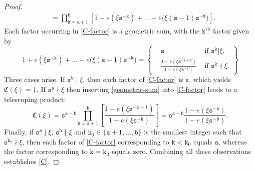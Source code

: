 \documentclass[12pt, twoside]{article}
\theoremstyle{definition}
\numberwithin{equation}{section}
\begin{document}
\begin{proof}
\begin{align}
&= \prod_{\mathtt k=\mathtt a+1}^{\mathtt b} \left[ 1 + e(\xi \mathtt s^{-\mathtt k}) + \ldots + e \bigl(\xi(\mathtt s-1) \mathtt s^{- \mathtt k} \bigr) \right].  \label{C-factor} 
\end{align} 
Each factor occurring in \eqref{C-factor} is a geometric sum, with the $\mathtt k^{\text{th}}$ factor given by 
\begin{equation}   1 + e(\xi \mathtt s^{-\mathtt k}) + \ldots + e \bigl(\xi(\mathtt s-1) \mathtt s^{- \mathtt k} \bigr) = \left\{ \begin{aligned} &\mathtt s &\text{ if } \mathtt s^{\mathtt k} | \xi, \\ &\frac{1 - e(\xi \mathtt s^{-\mathtt k + 1})}{1 - e(\xi \mathtt s^{-\mathtt k})} &\text{ if } \mathtt s^{\mathtt k} \nmid \xi.  \end{aligned} \right\} \label{geometric-sum}  \end{equation} 
Three cases arise. If $\mathtt s^{\mathtt b} \mid \xi$, then each factor of \eqref{C-factor} is $\mathtt s$, which yields $\mathfrak C(\xi) = 1$. If $\mathtt s^{\mathtt a} \nmid \xi$ then inserting \eqref{geometric-sum} into \eqref{C-factor} leads to a telescoping product: 
\[\mathfrak C(\xi) = \mathtt s^{\mathtt a - \mathtt b} \prod_{\mathtt k = \mathtt a+1}^{\mathtt b} \left[ \frac{1 - e(\xi \mathtt s^{-\mathtt k + 1})}{1 - e(\xi \mathtt s^{-\mathtt k})} \right] = \mathtt s^{\mathtt a- \mathtt b} \frac{1 - e(\xi \mathtt s^{-\mathtt a})}{1 - e(\xi \mathtt s^{-\mathtt b})}. \] 
Finally, if $\mathtt s^{\mathtt a} \mid \xi$, $\mathtt s^{\mathtt b} \nmid \xi$ and $\mathtt k_0 \in \{\mathtt a+1, \ldots, \mathtt b\}$ is the smallest integer such that $\mathtt s^{\mathtt k_0} \nmid \xi$, then each factor of \eqref{C-factor} corresponding to $\mathtt k < \mathtt k_0$ equals $\mathtt s$, whereas the factor corresponding to $\mathtt k = \mathtt k_0$ equals zero. Combining all these observations establishes \eqref{C}.  
\end{proof}
\end{document}
